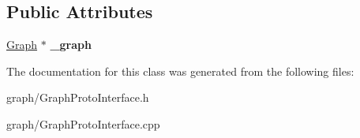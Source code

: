 \subsection*{Public Attributes}
\begin{DoxyCompactItemize}
\item 
\hypertarget{classGraphProtoInterface_a8e262de0a3f65eaa20e5c528363bbb2a}{
\hyperlink{classScarab_1_1Graph_1_1Graph}{Graph} $\ast$ {\bfseries \_\-graph}}
\label{classGraphProtoInterface_a8e262de0a3f65eaa20e5c528363bbb2a}

\end{DoxyCompactItemize}


The documentation for this class was generated from the following files:\begin{DoxyCompactItemize}
\item 
graph/GraphProtoInterface.h\item 
graph/GraphProtoInterface.cpp\end{DoxyCompactItemize}
